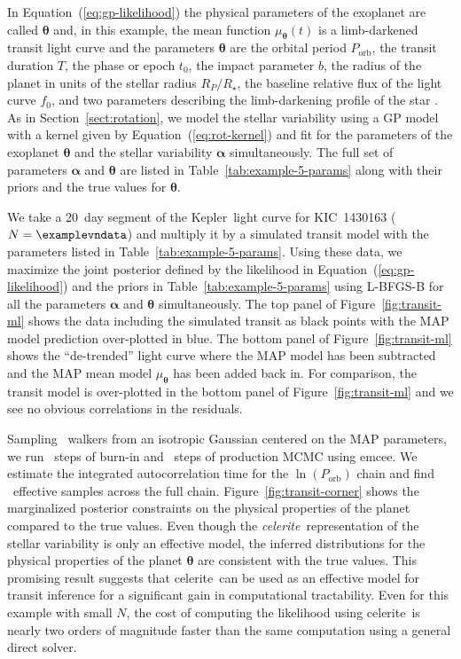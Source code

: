 \documentclass[manuscript, letterpaper]{aastex6}
\newcommand{\project}[1]{\textsf{#1}}
\newcommand{\kepler}{\project{Kepler}}
\newcommand{\celerite}{\project{celerite}}
\newcommand{\celeriteterm}{\emph{celerite}}
\newcommand{\emcee}{\project{emcee}}
\newcommand{\figureref}[1]{\ref{fig:#1}}
\newcommand{\Figure}[1]{Figure~\figureref{#1}}
\renewcommand{\eqref}[1]{\ref{eq:#1}}
\newcommand{\Eq}[1]{Equation~(\eqref{#1})}
\newcommand{\eq}[1]{\Eq{#1}}
\newcommand{\sectionname}{Section}
\newcommand{\sectref}[1]{\ref{sect:#1}}
\newcommand{\Sect}[1]{\sectionname~\sectref{#1}}
\newcommand{\sect}[1]{\Sect{#1}}
\newcommand{\bvec}[1]{{\ensuremath{\boldsymbol{#1}}}}
\newcommand{\response}[1]{{#1}}
\begin{document}
In \eq{gp-likelihood} the physical parameters of the exoplanet are called
$\bvec{\theta}$ and, in this example, the mean function $\mu_\bvec{\theta}(t)$
is a limb-darkened transit light curve \citep{Mandel:2002,
    Foreman-Mackey:2016a} and the parameters $\bvec{\theta}$ are the orbital
period $P_\mathrm{orb}$, the transit duration $T$, the phase or epoch $t_0$,
the impact parameter $b$, the radius of the planet in units of the stellar
radius $R_P/R_\star$, the baseline relative flux of the light curve $f_0$, and
two parameters describing the limb-darkening profile of the star
\citep{Claret:2011, Kipping:2013}.
As in \sect{rotation}, we model the stellar variability using a GP model
with a kernel given by \eq{rot-kernel} and fit for the parameters of the
exoplanet $\bvec{\theta}$ and the stellar variability $\bvec{\alpha}$
simultaneously.
\response{The full set of parameters $\bvec{\alpha}$ and $\bvec{\theta}$ are
    listed in Table~\ref{tab:example-5-params} along with their priors and the
    true values for $\bvec{\theta}$.}

\response{ We take a 20~day segment of the \kepler\ light curve for
    KIC~1430163 ($N = \examplevndata$) and multiply it by a simulated transit
    model with the parameters listed in Table~\ref{tab:example-5-params}.
    Using these data, we maximize the joint posterior defined by the likelihood in
    \eq{gp-likelihood} and the priors in Table~\ref{tab:example-5-params} using
    \project{L-BFGS-B} for all the parameters $\bvec{\alpha}$ and $\bvec{\theta}$
    simultaneously.
    The top panel of \Figure{transit-ml} shows the data including the simulated
    transit as black points with the MAP model prediction over-plotted in blue.
    The bottom panel of \Figure{transit-ml} shows the ``de-trended'' light curve
    where the MAP model has been subtracted and the MAP mean model
    $\mu_\bvec{\theta}$ has been added back in.
    For comparison, the transit model is over-plotted in the bottom panel of
    \Figure{transit-ml} and we see no obvious correlations in the residuals.

    Sampling \examplevnwalkers~walkers from an isotropic Gaussian centered on the
    MAP parameters, we run \examplevnburn~steps of burn-in and
    \examplevnsteps~steps of production MCMC using \emcee.
    We estimate the integrated autocorrelation time for the $\ln(P_\mathrm{orb})$
    chain and find \examplevneff~effective samples across the full chain.
    \Figure{transit-corner} shows the marginalized posterior constraints on the
    physical properties of the planet compared to the true values.
    Even though the \celeriteterm\ representation of the stellar variability is
    only an effective model, the inferred distributions for the physical
    properties of the planet $\bvec{\theta}$ are consistent with the true values.
    This promising result suggests that \celerite\ can be used as an effective
    model for transit inference for a significant gain in computational
    tractability.
    Even for this example with small $N$, the cost of computing the likelihood
    using \celerite\ is nearly two orders of magnitude faster than the same
    computation using a general direct solver.
}
\end{document}
